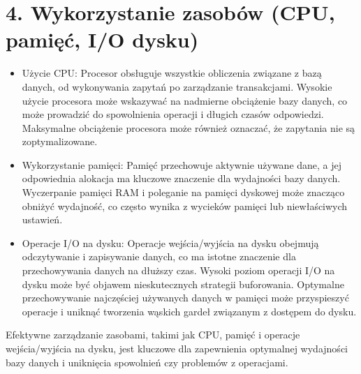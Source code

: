 \documentclass[letterpaper,10pt,polish]{sphinxmanual}
\begin{document}
\section{4. Wykorzystanie zasobów (CPU, pamięć, I/O dysku)}
\label{\detokenize{rozdzialy/rozdzial3:wykorzystanie-zasobow-cpu-pamiec-i-o-dysku}}\begin{description}
\begin{itemize}
\item {} 
\sphinxAtStartPar
Użycie CPU: Procesor obsługuje wszystkie obliczenia związane z bazą danych, od wykonywania zapytań po zarządzanie transakcjami. Wysokie użycie procesora może wskazywać na nadmierne obciążenie bazy danych, co może prowadzić do spowolnienia operacji i długich czasów odpowiedzi. Maksymalne obciążenie procesora może również oznaczać, że zapytania nie są zoptymalizowane.

\item {} 
\sphinxAtStartPar
Wykorzystanie pamięci: Pamięć przechowuje aktywnie używane dane, a jej odpowiednia alokacja ma kluczowe znaczenie dla wydajności bazy danych. Wyczerpanie pamięci RAM i poleganie na pamięci dyskowej może znacząco obniżyć wydajność, co często wynika z wycieków pamięci lub niewłaściwych ustawień.

\item {} 
\sphinxAtStartPar
Operacje I/O na dysku: Operacje wejścia/wyjścia na dysku obejmują odczytywanie i zapisywanie danych, co ma istotne znaczenie dla przechowywania danych na dłuższy czas. Wysoki poziom operacji I/O na dysku może być objawem nieskutecznych strategii buforowania. Optymalne przechowywanie najczęściej używanych danych w pamięci może przyspieszyć operacje i uniknąć tworzenia wąskich gardeł związanym z dostępem do dysku.

\end{itemize}

\end{description}

\sphinxAtStartPar
Efektywne zarządzanie zasobami, takimi jak CPU, pamięć i operacje wejścia/wyjścia na dysku, jest kluczowe dla zapewnienia optymalnej wydajności bazy danych i uniknięcia spowolnień czy problemów z operacjami.
\end{document}
